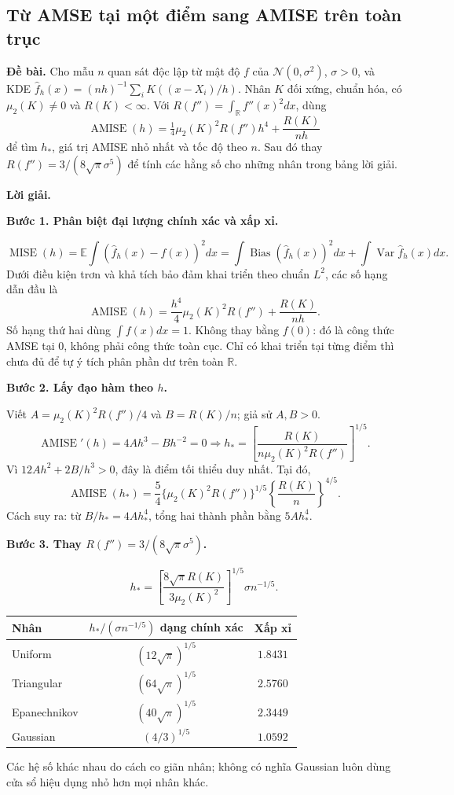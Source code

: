 \documentclass[11pt,a4paper]{article}
\DeclareMathOperator{\MISE}{MISE}
\DeclareMathOperator{\AMISE}{AMISE}
\newcommand{\E}{\mathbb E}
\newcommand{\R}{\mathbb R}
\newcommand{\fh}{\widehat f_h}
\DeclareMathOperator{\Var}{Var}
\DeclareMathOperator{\Bias}{Bias}
\newcommand{\buoc}[1]{\par\medskip\textbf{#1}\par}
\begin{document}
\subsection{Từ AMSE tại một điểm sang AMISE trên toàn trục}\label{sec:amise}
\textbf{Đề bài.} Cho mẫu $n$ quan sát độc lập từ mật độ $f$ của
$\mathcal N(0,\sigma^2)$, $\sigma>0$, và KDE
$\widehat f_h(x)=(nh)^{-1}\sum_iK((x-X_i)/h)$.
Nhân $K$ đối xứng, chuẩn hóa, có $\mu_2(K)\ne0$ và $R(K)<\infty$.
Với $R(f'')=\int_{\R}f''(x)^2dx$, dùng
\[
\AMISE(h)=\tfrac14\mu_2(K)^2R(f'')h^4+\frac{R(K)}{nh}
\]
để tìm $h_*$, giá trị AMISE nhỏ nhất và tốc độ theo $n$.
Sau đó thay $R(f'')=3/(8\sqrt\pi\sigma^5)$ để tính các hằng số cho những nhân trong bảng lời giải.

\textbf{Lời giải.}
\buoc{Bước 1. Phân biệt đại lượng chính xác và xấp xỉ.}
\[
\MISE(h)=\E\int(\fh(x)-f(x))^2dx
=\int\Bias(\fh(x))^2dx+\int\Var\fh(x)dx.
\]
Dưới điều kiện trơn và khả tích bảo đảm khai triển theo chuẩn $L^2$, các số hạng dẫn đầu là
\[
\boxed{\AMISE(h)=\frac{h^4}{4}\mu_2(K)^2R(f'')+\frac{R(K)}{nh}.}
\]
Số hạng thứ hai dùng $\int f(x)dx=1$. Không thay bằng $f(0)$: đó là công thức AMSE tại 0, không phải công thức toàn cục. Chỉ có khai triển tại từng điểm thì chưa đủ để tự ý tích phân phần dư trên toàn $\R$.

\buoc{Bước 2. Lấy đạo hàm theo $h$.}
Viết $A=\mu_2(K)^2R(f'')/4$ và $B=R(K)/n$; giả sử $A,B>0$.
\[
\AMISE'(h)=4Ah^3-Bh^{-2}=0
\Longrightarrow
\boxed{h_* =\left[\frac{R(K)}{n\mu_2(K)^2R(f'')}\right]^{1/5}.}
\]
Vì $12Ah^2+2B/h^3>0$, đây là điểm tối thiểu duy nhất. Tại đó,
\[
\boxed{\AMISE(h_*)=\frac54\big\{\mu_2(K)^2R(f'')\big\}^{1/5}
\left\{\frac{R(K)}n\right\}^{4/5}.}
\]
Cách suy ra: từ $B/h_*=4Ah_*^4$, tổng hai thành phần bằng $5Ah_*^4$.

\buoc{Bước 3. Thay $R(f'')=3/(8\sqrt\pi\sigma^5)$.}
\[
\boxed{h_* =\left[\frac{8\sqrt\pi R(K)}{3\mu_2(K)^2}\right]^{1/5}\sigma n^{-1/5}.}
\]
\begin{center}
\begin{tabular}{lcc}
\toprule
Nhân & $h_*/(\sigma n^{-1/5})$ dạng chính xác & Xấp xỉ\\
\midrule
Uniform & $(12\sqrt\pi)^{1/5}$ & $1.8431$\\
Triangular & $(64\sqrt\pi)^{1/5}$ & $2.5760$\\
Epanechnikov & $(40\sqrt\pi)^{1/5}$ & $2.3449$\\
Gaussian & $(4/3)^{1/5}$ & $1.0592$\\
\bottomrule
\end{tabular}
\end{center}
Các hệ số khác nhau do cách co giãn nhân; không có nghĩa Gaussian luôn dùng cửa sổ hiệu dụng nhỏ hơn mọi nhân khác.
\end{document}
